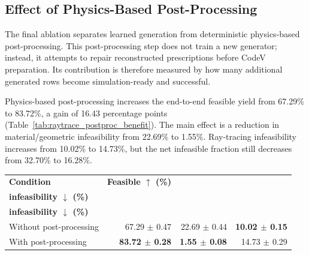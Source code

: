 \subsection{Effect of Physics-Based Post-Processing}
\label{sec:results_raytrace_postproc}

The final ablation separates learned generation from deterministic physics-based post-processing. This post-processing step does not train a new generator; instead, it attempts to repair reconstructed prescriptions before CodeV preparation. Its contribution is therefore measured by how many additional generated rows become simulation-ready and successful.

Physics-based post-processing increases the end-to-end feasible yield from 67.29\% to 83.72\%, a gain of 16.43 percentage points (Table~\ref{tab:raytrace_postproc_benefit}). The main effect is a reduction in material/geometric infeasibility from 22.69\% to 1.55\%. Ray-tracing infeasibility increases from 10.02\% to 14.73\%, but the net infeasible fraction still decreases from 32.70\% to 16.28\%.

\begin{center}
\begin{minipage}{0.98\linewidth}
\centering
\scriptsize
\setlength{\tabcolsep}{4pt}
\label{tab:raytrace_postproc_benefit}
\begin{tabular}{lrrr}
\toprule
\textbf{Condition} & \textbf{Feasible $\uparrow$ (\%)} & \shortstack{\textbf{Material/geometric}\\\textbf{infeasibility $\downarrow$ (\%)}} & \shortstack{\textbf{Ray-tracing}\\\textbf{infeasibility $\downarrow$ (\%)}} \\
\midrule
Without post-processing & 67.29 \ensuremath{\pm} 0.47 & 22.69 \ensuremath{\pm} 0.44 & \textbf{10.02 \ensuremath{\pm} 0.15} \\
With post-processing & \textbf{83.72 \ensuremath{\pm} 0.28} & \textbf{1.55 \ensuremath{\pm} 0.08} & 14.73 \ensuremath{\pm} 0.29 \\
\bottomrule
\end{tabular}
\end{minipage}
\end{center}

